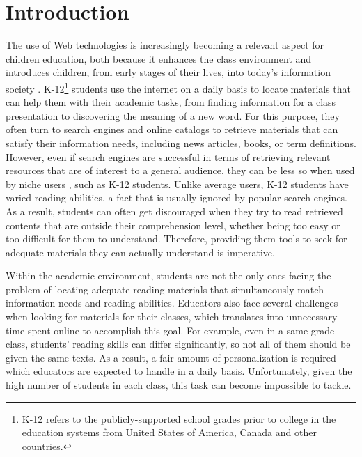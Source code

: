 \documentclass{sig-alternate-05-2015}
\begin{document}
\section{Introduction}
\noindent
The use of Web technologies is increasingly becoming a relevant aspect for children education, both because it enhances the class environment and introduces children, from early stages of their lives, into today's information society \cite{sadaf2012exploring}. K-12\footnote{K-12 refers to the publicly-supported school grades prior to college in the education systems from United States of America, Canada and other countries. } students use the internet on a daily basis to locate materials that can help them with their academic tasks, from finding information for a class presentation to discovering the meaning of a new word. For this purpose, they often turn to search engines and online catalogs to retrieve materials that can satisfy their information needs, including news articles, books, or term definitions. However, even if search engines are successful in terms of retrieving relevant resources that are of interest to a general audience, they can be less so when used by niche users \cite{wang2013personalized}, such as K-12 students. Unlike average users, K-12 students have varied  reading abilities, a fact that is usually ignored by popular search engines. As a result, students can often get discouraged when they try to read retrieved contents that are outside their comprehension level, whether being too easy or too difficult  for them to understand. Therefore, providing them tools to seek for adequate materials they can actually understand is imperative.



Within the academic environment, students are not the only ones facing the problem of locating adequate reading materials that simultaneously match information needs and reading abilities. Educators also face several challenges when looking for materials for their classes, which translates into unnecessary time spent online to accomplish this goal. For example, even in a same grade class, students' reading skills can differ significantly, so not all of them should be given the same texts. As a result, a fair amount of personalization is required which educators are expected to handle in a daily basis. Unfortunately, given the high number of students in each class, this task can become impossible to tackle. 
\end{document}
